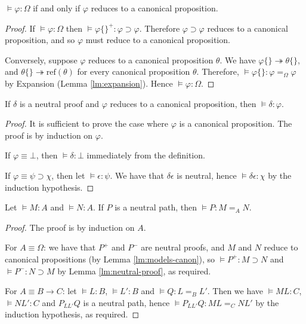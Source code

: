 \documentclass[a4paper,UKenglish]{lipics-v2016}
\newcommand*{\reff}[1]{\ensuremath{\mathrm{ref} \left( {#1} \right)}}
\theoremstyle{plain}
\theoremstyle{definition}
\begin{document}
\begin{lemma}
\label{lm:models-canon}
$\models \varphi : \Omega$ if and only if $\varphi$ reduces to a canonical proposition.
\end{lemma}

\begin{proof}
If $\models \varphi : \Omega$ then $\models \varphi \{\}^+ : \varphi \supset \varphi$.  Therefore $\varphi \supset \varphi$ reduces to a canonical proposition,
and so $\varphi$ must reduce to a canonical proposition.

Conversely, suppose $\varphi$ reduces to a canonical proposition $\theta$.  We have $\varphi \{\} \twoheadrightarrow \theta \{\}$, and $\theta \{\} \twoheadrightarrow \reff{\theta}$ for every canonical proposition $\theta$.  Therefore, $\models \varphi \{\} : \varphi =_\Omega \varphi$ by Expansion (Lemma \ref{lm:expansion}).  Hence $\models \varphi : \Omega$.
\end{proof}

\begin{lemma}
\label{lm:neutral-proof}
If $\delta$ is a neutral proof and $\varphi$ reduces to a canonical proposition, then $\models \delta : \varphi$.
\end{lemma}

\begin{proof}
It is sufficient to prove the case where $\varphi$ is a canonical proposition.  The proof is by induction on $\varphi$.

If $\varphi \equiv \bot$, then $\models \delta : \bot$ immediately from the definition.

If $\varphi \equiv \psi \supset \chi$, then let $\models \epsilon : \psi$.  We have that $\delta \epsilon$ is neutral,
hence $\models \delta \epsilon : \chi$ by the induction hypothesis.
\end{proof}

\begin{lemma}
\label{lm:neutral-path}
Let $\models M : A$ and $\models N : A$.  If $P$ is a neutral path, then $\models P : M =_A N$.
\end{lemma}

\begin{proof}
The proof is by induction on $A$.

For $A \equiv \Omega$: we have that $P^+$ and $P^-$ are neutral proofs, and $M$ and $N$ reduce to canonical propositions (by Lemma \ref{lm:models-canon}), so $\models P^+ : M \supset N$ and
$\models P^- : N \supset M$ by Lemma \ref{lm:neutral-proof}, as required.

For $A \equiv B \rightarrow C$: let $\models L : B$, $\models L' : B$ and $\models Q : L =_B L'$.  Then we have $\models ML : C$, $\models NL' : C$ and
$P_{LL'} Q$ is a neutral path, hence $\models P_{L L'} Q : ML =_C NL'$ by the induction hypothesis, as required.
\end{proof}
\end{document}
